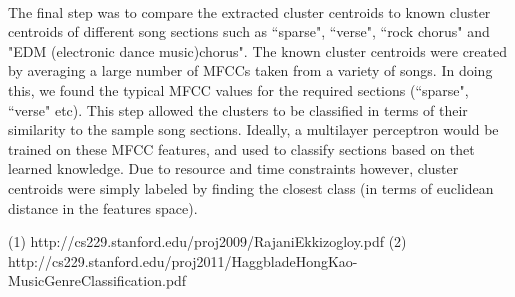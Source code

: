 \\
The final step was to compare the extracted cluster centroids to known cluster centroids of different song sections such as ``sparse", ``verse", ``rock chorus" and "EDM (electronic dance music)chorus". The known cluster centroids were created by averaging a large number of MFCCs taken from a variety of songs. In doing this, we found the typical MFCC values for the required sections (``sparse", ``verse" etc). This step allowed the clusters to be classified in terms of their similarity to the sample song sections. Ideally, a multilayer perceptron would be trained on these MFCC features, and used to classify sections based on thet learned knowledge. Due to resource and time constraints however, cluster centroids were simply labeled by finding the closest class (in terms of euclidean distance in the features space). 



(1) http://cs229.stanford.edu/proj2009/RajaniEkkizogloy.pdf
(2)	http://cs229.stanford.edu/proj2011/HaggbladeHongKao-MusicGenreClassification.pdf
